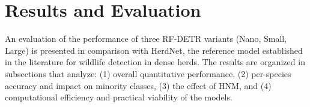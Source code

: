 %

\section{Results and Evaluation}

An evaluation of the performance of three RF-DETR variants (Nano, Small, Large) is presented in comparison with HerdNet, the reference model established in the literature for wildlife detection in dense herds. The results are organized in subsections that analyze: (1) overall quantitative performance, (2) per-species accuracy and impact on minority classes, (3) the effect of HNM, and (4) computational efficiency and practical viability of the models.

%
%
%
%
%
%

